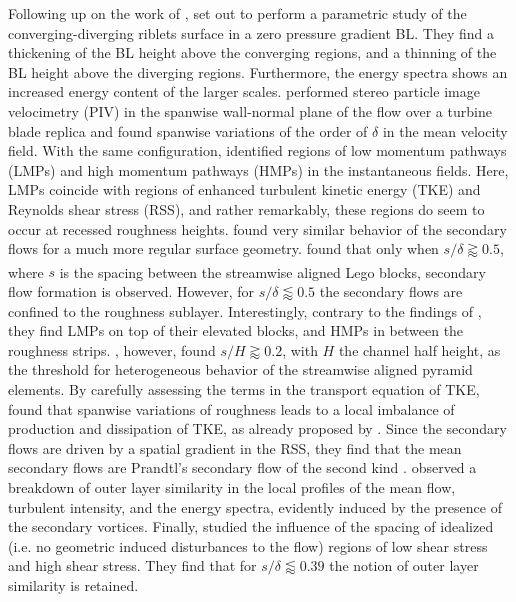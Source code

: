 \indent Following up on the work of \cite{Koeltzsch2002}, \cite{Nugroho2013} set out to perform a parametric study of the converging-diverging riblets surface in a zero pressure gradient BL. They find a thickening of the BL height above the converging regions, and a thinning of the BL height above the diverging regions. Furthermore, the energy spectra shows an increased energy content of the larger scales. \cite{Barros2014} performed stereo particle image velocimetry (PIV) in the spanwise wall-normal plane of the flow over a turbine blade replica and found spanwise variations of the order of $\delta$ in the mean velocity field. With the same configuration, \citet{Mejia-Alvarez2013} identified regions of low momentum pathways (LMPs) and high momentum pathways (HMPs) in the instantaneous fields. Here, LMPs coincide with regions of enhanced turbulent kinetic energy (TKE) and Reynolds shear stress (RSS), and rather remarkably, these regions do seem to occur at recessed roughness heights.
\cite{Willingham2014} found very similar behavior of the secondary flows for a much more regular surface geometry.
\cite{vanderWel2015} found that only when $s/\delta \gtrapprox 0.5$, where $s$ is the spacing between the streamwise aligned Lego\textsuperscript{\textregistered} blocks, secondary flow formation is observed. However, for $s/\delta \lessapprox 0.5$ the secondary flows are confined to the roughness sublayer. Interestingly, contrary to the findings of \citet{Mejia-Alvarez2013}, they find LMPs on top of their elevated blocks, and HMPs in between the roughness strips.
\cite{Yang2017}, however, found $s/H \gtrapprox 0.2$, with $H$ the channel half height, as the threshold for heterogeneous behavior of the streamwise aligned pyramid elements. By carefully assessing the terms in the transport equation of TKE, \cite{Anderson2015} found that spanwise variations of roughness leads to a local imbalance of production and dissipation of TKE, as already proposed by \cite{Hinze1967}.
Since the secondary flows are driven by a spatial gradient in the RSS, they find that the mean secondary flows are Prandtl's secondary flow of the second kind \citep{Bradshaw1987}.
\cite{Medjnoun2018} observed a breakdown of outer layer similarity in the local profiles of the mean flow, turbulent intensity, and the energy spectra, evidently induced by the presence of the secondary vortices.
Finally, \cite{Chung2018} studied the influence of the spacing of idealized (i.e. no geometric induced disturbances to the flow) regions of low shear stress and high shear stress.
They find that for $s/\delta \lessapprox 0.39$ the notion of outer layer similarity is retained.
